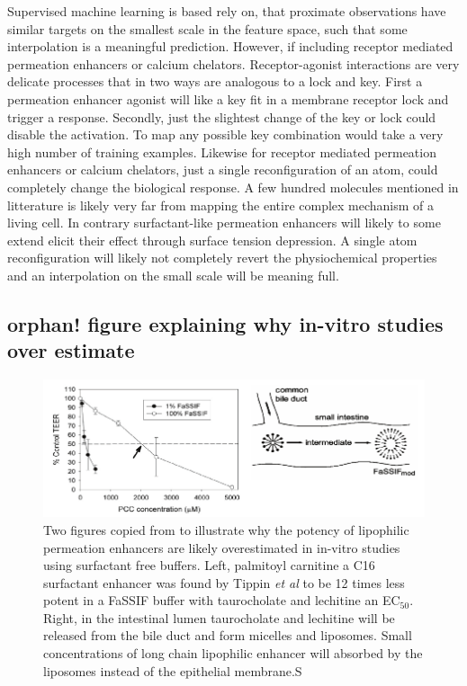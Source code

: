 Supervised machine learning is based rely on, that proximate observations have similar targets on the smallest scale in the feature space, such that some interpolation is a meaningful prediction. However, if including receptor mediated permeation enhancers or calcium chelators. Receptor-agonist interactions are very delicate processes that in two ways are analogous to a lock and key. First a permeation enhancer agonist will like a key fit in a membrane receptor lock and trigger a response. Secondly, just the slightest change of the key or lock could disable the activation. To map any possible key combination would take a very high number of training examples. Likewise for receptor mediated permeation enhancers or calcium chelators, just a single reconfiguration of an atom, could completely change the biological response. A few hundred molecules mentioned in litterature is likely very far from mapping the entire complex mechanism of a living cell. In contrary surfactant-like permeation enhancers will likely to some extend elicit their effect through surface tension depression. A single atom reconfiguration will likely not completely revert the physiochemical properties and an interpolation on the small scale will be meaning full.

\subsection{orphan! figure explaining why in-vitro studies over estimate}
\begin{figure}[!htpb]
\includegraphics[width=\textwidth,height=\textheight,keepaspectratio]{graphics/develop_fassif.pdf}
\caption{Two figures copied from \cite{tippin2008biorelevant,nawroth2011liposome} to illustrate why the potency of lipophilic permeation enhancers are likely overestimated in in-vitro studies using surfactant free buffers. Left, palmitoyl carnitine a C16 surfactant enhancer was found by Tippin \textit{et al} to be 12 times less potent in a FaSSIF buffer with taurocholate and lechitine an EC$_{50}$. Right, in the intestinal lumen taurocholate and lechitine will be released from the bile duct and form micelles and liposomes. Small concentrations of long chain lipophilic enhancer will absorbed by the liposomes instead of the epithelial membrane.S}
\label{devel_fassif}
\end{figure}

